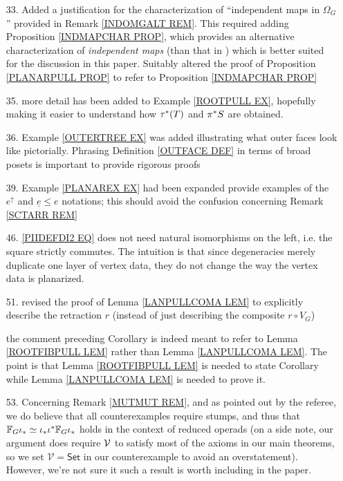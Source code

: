 \documentclass{article}
\begin{document}
\begin{itemize}
  \item[33.] Added a justification for 
	the characterization of ``independent maps in $\Omega_G$''
	provided in Remark \ref{INDOMGALT REM}.
	This required adding 
	Proposition \ref{INDMAPCHAR PROP},
	which provides an alternative characterization of \emph{independent maps}
	(than that in \cite[Def. 5.28]{Pe17})
	which is better suited for the discussion in this paper.
	Suitably altered the proof of Proposition \ref{PLANARPULL PROP}
	to refer to Proposition \ref{INDMAPCHAR PROP}
        
	\item[35.] more detail has been added to Example \ref{ROOTPULL EX}, hopefully making it easier to understand 
	how $\tau^{\**}(T)$ and $\pi^{\**}S$ are obtained.
	
	\item[36.] Example \ref{OUTERTREE EX} was added illustrating what outer faces look like pictorially. 
	Phrasing Definition \ref{OUTFACE DEF} 
	in terms of broad posets   
	is important to provide rigorous proofs
	
	\item[39.] Example \ref{PLANAREX EX} had been expanded provide examples of the $e^{\uparrow}$
	and $\underline{e} \leq e$
	notations; this should avoid the confusion concerning 
	Remark \ref{SCTARR REM}
	
	\item[46.] \eqref{PIIDEFDI2 EQ} does not need natural isomorphisms on the left, i.e. the square strictly commutes. The intuition is that since degeneracies merely duplicate one layer of vertex data, they do not change the way the vertex data is planarized. 
	
	\item[51.] 
	revised the proof of Lemma \ref{LANPULLCOMA LEM}
	to explicitly describe the retraction $r$ (instead of just describing the composite $r \circ V_G$)
	
	the comment preceding Corollary \label{MONDEFCOR COR}
	is indeed meant to refer to Lemma \ref{ROOTFIBPULL LEM}
	rather than Lemma \ref{LANPULLCOMA LEM}.
	The point is that Lemma \ref{ROOTFIBPULL LEM}
	is needed to state Corollary \label{MONDEFCOR COR}
	while 
	Lemma \ref{LANPULLCOMA LEM} is needed to prove it.

	\item[53.] Concerning Remark \ref{MUTMUT REM},
	and as pointed out by the referee,
	we do believe that all counterexamples require stumps,
	and thus that
	$\mathbb{F}_G \iota_{\**} \simeq 
	\iota_{\**} \iota^{\**} \mathbb{F}_G \iota_{\**}$
	holds in the context of reduced operads
	(on a side note, our argument does require $\mathcal V$ to satisfy most of the axioms in our main theorems, 
	so we set $\mathcal{V}=\mathsf{Set}$ in our counterexample
	to avoid an overstatement).
%	
	However, we're not sure it such a result is worth including in the paper.
	

\end{itemize}
\end{document}
